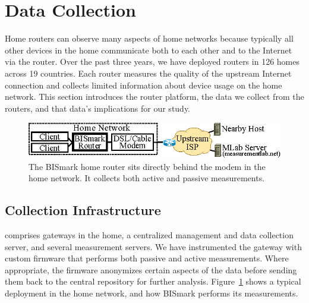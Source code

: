 \section{Data Collection}\label{sec:data}

Home routers can observe many aspects of home networks because typically all
other devices in the home communicate both to each other and to the Internet via
the router. Over the past three years, we have deployed routers in 126 homes across
19 countries. Each router measures the quality of the upstream Internet
connection and collects limited information about device usage on the home
network. This section introduces the router platform, the data we collect from
the routers, and that data's implications for our study.

\begin{figure}[t!]
 \begin{center}
\includegraphics{figures/schematic-cacm.eps}
\caption{The BISmark home router sits directly behind
  the modem in the home network.  It collects both active and passive
  measurements.}\label{fig:bismark-deployment} 
\end{center}
\end{figure}


\subsection{Collection Infrastructure}

\name{} comprises gateways in the home, a centralized management and
data collection server, and several measurement servers. We have
instrumented the gateway with custom firmware that performs both passive
and active measurements. Where appropriate, the firmware anonymizes
certain aspects of the data before sending them back to the central
repository for further analysis.  Figure~\ref{fig:bismark-deployment}
shows a typical deployment in the home network, and how BISmark performs
its measurements.

